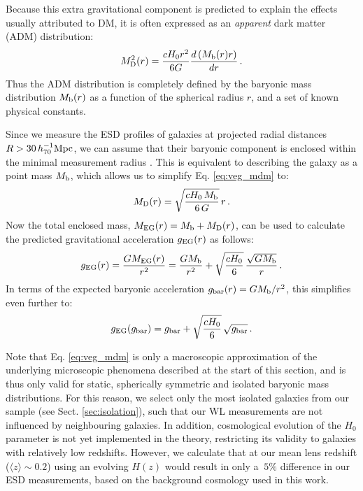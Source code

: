 \documentclass[usenatbib]{mnras}
\newcommand{\hsMpc}{\, h_{70}^{-1}{\rm{Mpc}} }
\newcommand{\un}[1]{_{\rm #1}}
\begin{document}
Because this extra gravitational component is predicted to explain the effects usually attributed to DM, it is often expressed as an \emph{apparent} dark matter (ADM) distribution:
\begin{equation}
M_{\rm D}^2 (r) = \frac{  cH_0 r^2}{6G} \frac{d\left( M_{\rm b}(r) r \right)}{dr} \, .
\label{eq:veg_mdm}
\end{equation}
Thus the ADM distribution is completely defined by the baryonic mass distribution $M\un{b}(r)$ as a function of the spherical radius $r$, and a set of known physical constants.

Since we measure the ESD profiles of galaxies at projected radial distances $R>30 \hsMpc$, we can assume that their baryonic component is enclosed within the minimal measurement radius \cite[see also][]{brouwer2017}. This is equivalent to describing the galaxy as a point mass $M\un{b}$, which allows us to simplify Eq. \ref{eq:veg_mdm} to:
\begin{equation}
M_{\rm D}(r)=\sqrt{\frac{cH_{0} \, M_{\rm b}}{6 \, G}} \, r \, .
\end{equation}
Now the total enclosed mass, $M\un{EG}(r) = M\un{b} + M\un{D}(r)$, can be used to calculate the predicted gravitational acceleration $g\un{EG}(r)$ as follows:
\begin{equation}
	g_{\rm EG}(r) = \frac{G M\un{EG}(r)}{r^2} = \frac{G M\un{b}}{r^2} + \sqrt{\frac{cH_{0}}{6}} \, \frac{\sqrt{G M_{\rm b}}}{r} \, .
\end{equation}
In terms of the expected baryonic acceleration $g\un{bar}(r) = G M\un{b}/r^2$, this simplifies even further to:
\begin{equation}
g_{\rm EG}(g\un{bar}) = g\un{bar} + \sqrt{\frac{cH_{0}}{6}} \, \sqrt{g\un{bar}} \, .
\end{equation}

Note that Eq. \ref{eq:veg_mdm} is only a macroscopic approximation of the underlying microscopic phenomena described at the start of this section, and is thus only valid for static, spherically symmetric and isolated baryonic mass distributions. For this reason, we select only the most isolated galaxies from our sample (see Sect. \ref{sec:isolation}), such that our WL measurements are not influenced by neighbouring galaxies. In addition, cosmological evolution of the $H_0$ parameter is not yet implemented in the theory, restricting its validity to galaxies with relatively low redshifts. However, we calculate that at our mean lens redshift ($\langle z \rangle \sim 0.2$) using an evolving $H(z)$ would result in only a $~5\%$ difference in our ESD measurements, based on the background cosmology used in this work.
\end{document}
